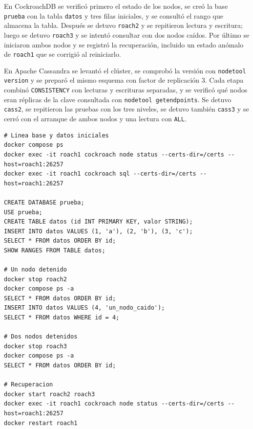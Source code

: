 \documentclass[11pt,a4paper]{article}
\newcommand{\sistemaA}{CockroachDB}      %
\newcommand{\sistemaB}{Apache Cassandra} %
\begin{document}
En \sistemaA{} se verificó primero el estado de los nodos, se creó la base
\texttt{prueba} con la tabla \texttt{datos} y tres filas iniciales, y se consultó
el rango que almacena la tabla. Después se detuvo \texttt{roach2} y se repitieron
lectura y escritura; luego se detuvo \texttt{roach3} y se intentó consultar con dos
nodos caídos. Por último se iniciaron ambos nodos y se registró la recuperación,
incluido un estado anómalo de \texttt{roach1} que se corrigió al reiniciarlo.

En \sistemaB{} se levantó el clúster, se comprobó la versión con
\texttt{nodetool version} y se preparó el mismo esquema con factor de replicación 3.
Cada etapa combinó \texttt{CONSISTENCY} con lecturas y escrituras separadas, y se
verificó qué nodos eran réplicas de la clave consultada con
\texttt{nodetool getendpoints}. Se detuvo \texttt{cass2}, se repitieron las pruebas
con los tres niveles, se detuvo también \texttt{cass3} y se cerró con el arranque de
ambos nodos y una lectura con \texttt{ALL}.

\begin{lstlisting}[caption={Comandos del experimento 1 en \sistemaA{} (extracto).},label={lst:e1-crdb}]
# Linea base y datos iniciales
docker compose ps
docker exec -it roach1 cockroach node status --certs-dir=/certs --host=roach1:26257
docker exec -it roach1 cockroach sql --certs-dir=/certs --host=roach1:26257

CREATE DATABASE prueba;
USE prueba;
CREATE TABLE datos (id INT PRIMARY KEY, valor STRING);
INSERT INTO datos VALUES (1, 'a'), (2, 'b'), (3, 'c');
SELECT * FROM datos ORDER BY id;
SHOW RANGES FROM TABLE datos;

# Un nodo detenido
docker stop roach2
docker compose ps -a
SELECT * FROM datos ORDER BY id;
INSERT INTO datos VALUES (4, 'un_nodo_caido');
SELECT * FROM datos WHERE id = 4;

# Dos nodos detenidos
docker stop roach3
docker compose ps -a
SELECT * FROM datos ORDER BY id;

# Recuperacion
docker start roach2 roach3
docker exec -it roach1 cockroach node status --certs-dir=/certs --host=roach1:26257
docker restart roach1
\end{lstlisting}
\end{document}
